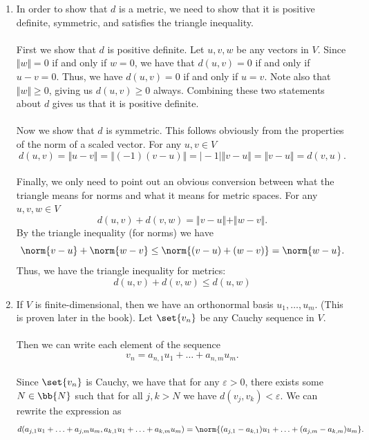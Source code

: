 \documentclass[12pt,letterpaper]{hmcpset}
\begin{document}
\begin{solution}
    \begin{enumerate}
        \item In order to show that $d$ is a metric, we need to show that it is positive definite, symmetric, and satisfies the triangle inequality.\\\\
        First we show that $d$ is positive definite. Let \( u, v, w \) be any vectors in $V$. Since \( \Vert w \Vert = 0 \) if and only if \( w = 0 \), we have that \( d (u, v) = 0 \) if and only if \( u - v = 0 \). Thus, we have \( d (u, v) = 0 \) if and only if \( u = v \). Note also that \( \Vert w \Vert \ge 0 \), giving us \( d(u, v) \ge 0 \) always. Combining these two statements about $d$ gives us that it is positive definite.\\\\
        Now we show that $d$ is symmetric. This follows obviously from the properties of the norm of a scaled vector. For any \( u, v \in V \)
        \[
        d(u, v) = \Vert u - v \Vert = \Vert (-1) (v - u) \Vert = \vert -1 \vert \Vert v - u \Vert = \Vert v - u \Vert = d(v, u).
        \]\\
        Finally, we only need to point out an obvious conversion between what the triangle means for norms and what it means for metric spaces. For any \( u, v, w \in V \) 
        \[
        d(u, v) + d(v, w) = \Vert v - u \Vert + \Vert w - v \Vert.
        \]
        By the triangle inequality (for norms) we have
        \[
        \norm{v - u} + \norm{w - v} \le \norm{(v - u) + (w - v)} = \norm{w - u}.
        \]
        Thus, we have the triangle inequality for metrics:
        \[
        d(u, v) + d(v, w) \le d(u, w)
        \]
        \item If $V$ is finite-dimensional, then we have an orthonormal basis \(u_1, \ldots, u_m\). (This is proven later in the book). Let $\set{v_n}$ be any Cauchy sequence in $V$.\\\\
        Then we can write each element of the sequence
        \[
        v_n = a_{n, 1} u_1 + \ldots + a_{n, m} u_m.
        \]\\
        Since $\set{v_n}$ is Cauchy, we have that for any \( \varepsilon > 0 \), there exists some \( N \in \bb{N} \) such that for all \( j, k > N \) we have \( d(v_j, v_k) < \varepsilon \). We can rewrite the expression as
        \[
        d(a_{j, 1} u_1 + \ldots + a_{j, m} u_m, a_{k, 1} u_1 + \ldots + a_{k, m} u_m) = \norm{ (a_{j, 1} - a_{k, 1}) u_1 + \ldots + (a_{j, m} - a_{k, m}) u_m}.
\]
\end{enumerate}
\end{solution}
\end{document}
